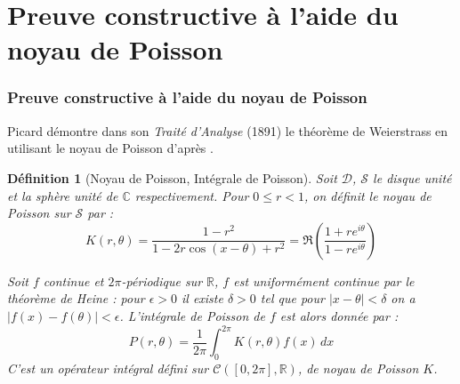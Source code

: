 \documentclass[
	10pt, %
	xcolor={svgnames}
]{beamer}
\newtheorem{defi}[subsubsection]{Définition}
\begin{document}
\section{Preuve constructive à l'aide du noyau de Poisson}
\begin{frame}
\frametitle{Preuve constructive à l'aide du noyau de Poisson}

Picard démontre dans son \textit{Traité d'Analyse} (1891) le théorème de Weierstrass en utilisant le noyau de Poisson d'après \cite[p.~19-22]{pinkus2000approximation}.
 
\begin{defi}[Noyau de Poisson, Intégrale de Poisson]
	Soit \( \mathcal{D} \), \( \mathcal{S} \) le disque unité et la sphère unité de \( \mathbb{C} \) respectivement. Pour \( 0 \leq r < 1 \), on définit le noyau de Poisson sur \( \mathcal{S} \) par :
\begin{equation*}
	K(r,\theta) = \frac{1 - r^{2}}{1-2r\cos(x-\theta)+r^{2}} = \Re(\frac{1 + re^{i\theta}}{1 - re^{i\theta}})
\end{equation*}

Soit \( f \) continue et \( 2\pi\)-périodique sur \( \mathbb{R} \), \( f \) est uniformément continue par le théorème de Heine : pour \( \epsilon > 0 \) il existe \( \delta > 0 \) tel que pour \( {\left\lvert x - \theta \right\rvert} < \delta \) on a \( {\left\lvert f(x) - f(\theta) \right\rvert} < \epsilon \). L'intégrale de Poisson de \( f \) est alors donnée par :
\begin{equation*}
	P(r,\theta) = \frac{1}{2\pi} \int_0^{2\pi} 
	K(r,\theta) f(x) \, dx
\end{equation*}
C'est un opérateur intégral défini sur \( \mathcal{C}([0,2\pi],\mathbb{R}) \), de noyau de Poisson \( K \). \nocite{pinkus2000approximation}

	\end{defi}
\end{frame}
\end{document}
